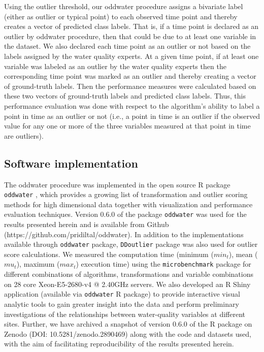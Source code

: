 \documentclass[draft]{agujournal2018} %
\begin{document}
Using the outlier threshold, our \color{black} oddwater procedure \color{black} assigns a bivariate
label (either as outlier or typical point) to each observed time point
and thereby creates a vector of predicted class labels. That is, if a
time point is declared as an outlier by \color{black} oddwater procedure, \color{black} then
that could be due to at least one variable in the dataset. We also
declared each time point as an outlier or not based on the labels
assigned by the water quality experts. At a given time point, if at
least one variable was labeled as an outlier by the water quality
experts then the corresponding time point was marked as an outlier and
thereby creating a vector of ground-truth labels. Then the performance
measures were calculated based on these two vectors of ground-truth
labels and predicted class labels. \color{black} Thus, this performance evaluation was done with respect to the algorithm's ability to label a point in time as an outlier or not (i.e., a point in time is an outlier if the observed value for any one or more of the three variables measured at that point in time are outliers). \color{black}

\subsection{Software implementation} \label{sec:rpackage}

The \color{black} oddwater procedure \color{black} was implemented in the open source R package
\texttt{oddwater} \citep{oddwater2018}, which provides a
growing list of transformation and outlier scoring methods for
high dimensional data together with visualization and performance
evaluation techniques. Version 0.6.0 of the package \texttt{oddwater} was used for the
results presented herein and is available from Github \color{black} (https://github.com/pridiltal/oddwater). In addition to the implementations available through \texttt{oddwater} package, \texttt{DDoutlier} package \citep{madsen2018ddoutlier} was also  used for outlier score calculations. \color{black} We measured the computation time (minimum
(\(min_t\)), mean (\(mu_t\)), maximum (\(max_t\)) execution time) using
the \texttt{microbenchmark} package \citep{microbenchmark} for
different combinations of algorithms, transformations and variable
combinations on 28 core Xeon-E5-2680-v4 @ 2.40GHz servers. \color{black} We also developed an R Shiny application (available via \texttt{oddwater} R package) to provide interactive visual analytic tools to gain greater insight into the data and perform preliminary investigations of the relationships between water-quality variables at different sites. Further, we have archived a snapshot of version 0.6.0 of the R package on Zenodo (DOI: 10.5281/zenodo.2890469) along with the code and  datasets used, with the aim of  facilitating reproducibility of the results presented herein. \color{black}
\end{document}
